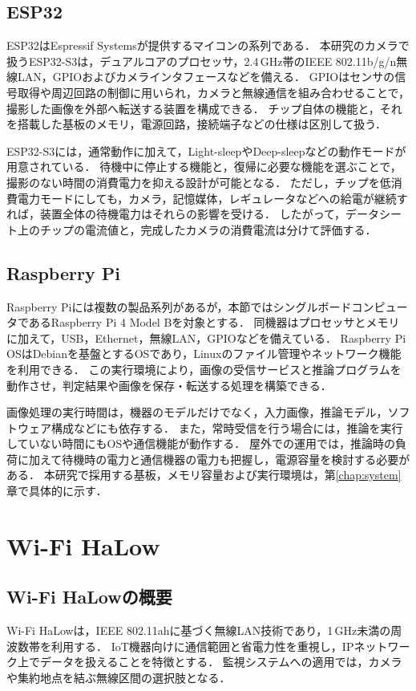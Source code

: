 \subsection{ESP32}
ESP32はEspressif Systemsが提供するマイコンの系列である．
本研究のカメラで扱うESP32-S3は，デュアルコアのプロセッサ，2.4\,GHz帯のIEEE 802.11b/g/n無線LAN，GPIOおよびカメラインタフェースなどを備える\cite{ESP32S3}．
GPIOはセンサの信号取得や周辺回路の制御に用いられ，カメラと無線通信を組み合わせることで，撮影した画像を外部へ転送する装置を構成できる．
チップ自体の機能と，それを搭載した基板のメモリ，電源回路，接続端子などの仕様は区別して扱う．

ESP32-S3には，通常動作に加えて，Light-sleepやDeep-sleepなどの動作モードが用意されている\cite{ESP32S3}．
待機中に停止する機能と，復帰に必要な機能を選ぶことで，撮影のない時間の消費電力を抑える設計が可能となる．
ただし，チップを低消費電力モードにしても，カメラ，記憶媒体，レギュレータなどへの給電が継続すれば，装置全体の待機電力はそれらの影響を受ける．
したがって，データシート上のチップの電流値と，完成したカメラの消費電流は分けて評価する．

\subsection{Raspberry Pi}
Raspberry Piには複数の製品系列があるが，本節ではシングルボードコンピュータであるRaspberry Pi 4 Model Bを対象とする．
同機器はプロセッサとメモリに加えて，USB，Ethernet，無線LAN，GPIOなどを備えている\cite{RaspberryPi4}．
Raspberry Pi OSはDebianを基盤とするOSであり，Linuxのファイル管理やネットワーク機能を利用できる\cite{RaspberryPiOS}．
この実行環境により，画像の受信サービスと推論プログラムを動作させ，判定結果や画像を保存・転送する処理を構築できる．

画像処理の実行時間は，機器のモデルだけでなく，入力画像，推論モデル，ソフトウェア構成などにも依存する．
また，常時受信を行う場合には，推論を実行していない時間にもOSや通信機能が動作する．
屋外での運用では，推論時の負荷に加えて待機時の電力と通信機器の電力も把握し，電源容量を検討する必要がある．
本研究で採用する基板，メモリ容量および実行環境は，第\ref{chap:system}章で具体的に示す．

\section{Wi-Fi HaLow}
\label{sec:background-halow}
\subsection{Wi-Fi HaLowの概要}
Wi-Fi HaLowは，IEEE 802.11ahに基づく無線LAN技術であり，1\,GHz未満の周波数帯を利用する．
IoT機器向けに通信範囲と省電力性を重視し，IPネットワーク上でデータを扱えることを特徴とする\cite{HaLowOverview,HaLowMM6108}．
監視システムへの適用では，カメラや集約地点を結ぶ無線区間の選択肢となる．

